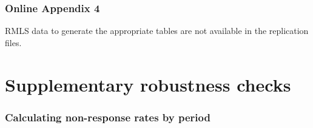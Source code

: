 \documentclass[
  letterpaper,
  DIV=11,
  numbers=noendperiod]{scrartcl}
\begin{document}
\subsubsection{Online Appendix 4}\label{online-appendix-4}

RMLS data to generate the appropriate tables are not available in the
replication files.

\section{Supplementary robustness
checks}\label{supplementary-robustness-checks}

\subsubsection{Calculating non-response rates by
period}\label{calculating-non-response-rates-by-period}
\end{document}

